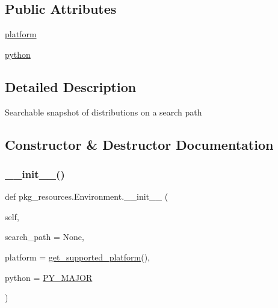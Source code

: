 \subsection*{Public Attributes}
\begin{DoxyCompactItemize}
\item 
\hyperlink{classpkg__resources_1_1Environment_a8512772df91acc77fc4ea47e2d483e7a}{platform}
\item 
\hyperlink{classpkg__resources_1_1Environment_a92643caa8139bba1bd63c32c22d1878c}{python}
\end{DoxyCompactItemize}


\subsection{Detailed Description}
\begin{DoxyVerb}Searchable snapshot of distributions on a search path\end{DoxyVerb}
 

\subsection{Constructor \& Destructor Documentation}
\mbox{\label{classpkg__resources_1_1Environment_ac17977fcfff1f90f694316f938090eb2}} 
\subsubsection{\texorpdfstring{\+\_\+\+\_\+init\+\_\+\+\_\+()}{\_\_init\_\_()}}
{\footnotesize\ttfamily def pkg\+\_\+resources.\+Environment.\+\_\+\+\_\+init\+\_\+\+\_\+ (\begin{DoxyParamCaption}\item[{}]{self,  }\item[{}]{search\+\_\+path = {\ttfamily None},  }\item[{}]{platform = {\ttfamily \hyperlink{namespacepkg__resources_a2ad1c6a7e428d89c722264e41cc9214e}{get\+\_\+supported\+\_\+platform}()},  }\item[{}]{python = {\ttfamily \hyperlink{namespacepkg__resources_a27901fd744697f2b2d55b6f1255cf020}{P\+Y\+\_\+\+M\+A\+J\+OR}} }\end{DoxyParamCaption})}

